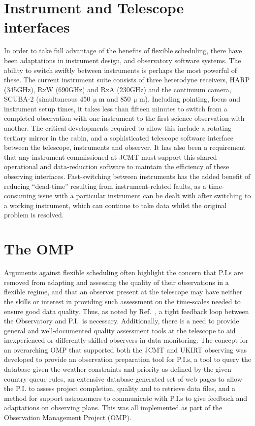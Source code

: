 \documentclass[]{spie}  %
\begin{document}
\section{Instrument and Telescope interfaces}\label{sec:inst}

In order to take full advantage of the benefits of flexible
scheduling, there have been adaptations in instrument design, and
observatory software systems. The ability to switch swiftly between
instruments is perhaps the most powerful of these. The current
instrument suite consists of three heterodyne receivers, HARP
(345GHz), RxW (690GHz) and RxA (230GHz) and the continuum camera,
SCUBA-2 (simultaneous 450\,$\upmu$m and 850\,$\upmu$m). Including pointing,
focus and instrument setup times, it takes less than fifteen minutes
to switch from a completed observation with one instrument to the
first science observation with another. The critical developments
required to allow this include a rotating tertiary mirror in the
cabin, and a sophisticated telescope software interface between the
telescope, instruments and observer\cite{rees2002,walther2010,2011tfa..confE..42J,kackley2004}. It has also
been a requirement that any instrument commissioned at JCMT must
support this shared operational and data-reduction software\cite{cavanagh2008} to
maintain the efficiency of these observing interfaces. Fast-switching
between instruments has the added benefit of reducing ``dead-time''
resulting from instrument-related faults, as a time-consuming issue
with a particular instrument can be dealt with after switching to a
working instrument, which can continue to take data whilst the
original problem is resolved.



\section{The OMP}\label{sec:omp}

Arguments against flexible scheduling often highlight the concern that
P.I.s are removed from adapting and assessing the quality of their
observations in a flexible regime, and that an observer present at the
telescope may have neither the skills or interest in providing such
assessment on the time-scales needed to ensure good data
quality. Thus, as noted by Ref.\ , a tight feedback loop
between the Observatory and P.I.\ is necessary. Additionally, there is a
need to provide general and well-documented quality assessment tools
at the telescope to aid inexperienced or differently-skilled observers
in data monitoring. The concept for an overarching OMP that supported
both the JCMT and UKIRT observing was developed to provide an
observation preparation tool for P.I.s, a tool to query the database
given the weather constraints and priority as defined by the given
country queue rules, an extensive database-generated set of web pages
to allow the P.I. to assess project completion, quality and to retrieve
data files, and a method for support astronomers to communicate with
P.I.s to give feedback and adaptations on observing plans.  This was all implemented as part of the Observation Management
Project (OMP)\cite{2011tfa..confE..42J,economou2002}.\\
\end{document}

